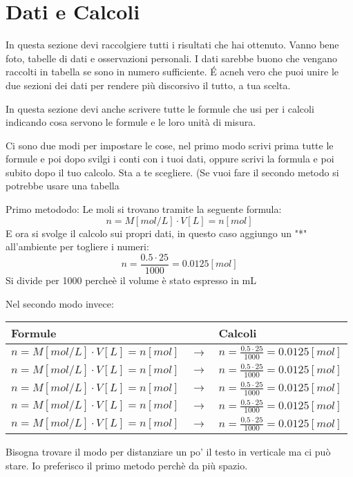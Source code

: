 \section{Dati e Calcoli}
In questa sezione devi raccolgiere tutti i risultati che hai ottenuto. Vanno bene  foto, tabelle di dati e osservazioni personali. I dati sarebbe buono che vengano raccolti in tabella se sono in numero sufficiente. \'E acneh vero che puoi unire le due sezioni dei dati per rendere più discorsivo il tutto, a tua scelta.

In questa sezione devi anche scrivere tutte le formule che usi per i calcoli indicando cosa servono le formule e le loro unità di misura.

Ci sono due modi per impostare le cose, nel primo modo scrivi prima tutte le formule e poi dopo svilgi i conti con i tuoi dati, oppure scrivi la formula e poi subito dopo il tuo calcolo. Sta a te scegliere. (Se vuoi fare il secondo metodo si potrebbe usare una tabella

Primo metododo:
Le moli si trovano tramite la seguente formula:
\begin{equation}
   n=M[mol/L]\cdot V[L]=n [mol] 
   \label{eq:mol} %
\end{equation}
E ora si svolge il calcolo sui propri dati, in questo caso aggiungo un "*" all'ambiente per togliere i numeri:
\begin{equation*}
   n=\frac{0.5\cdot 25}{1000}=0.0125 [mol] 
\end{equation*}
Si divide per  1000 percheè il volume è stato espresso in mL

Nel secondo modo invece:
\begin{center}
    \begin{tabularx}{0.9\textwidth}{XcX}
    Formule & & Calcoli\\
    \midrule
    $n=M[mol/L]\cdot V[L]=n [mol] $ &$\rightarrow$& $ n=\frac{0.5\cdot 25}{1000}=0.0125 [mol] $\\
    $n=M[mol/L]\cdot V[L]=n [mol] $ &$\rightarrow$& $ n=\frac{0.5\cdot 25}{1000}=0.0125 [mol] $\\
    $n=M[mol/L]\cdot V[L]=n [mol] $ &$\rightarrow$& $ n=\frac{0.5\cdot 25}{1000}=0.0125 [mol] $\\
    $n=M[mol/L]\cdot V[L]=n [mol] $ &$\rightarrow$& $ n=\frac{0.5\cdot 25}{1000}=0.0125 [mol] $\\
    $n=M[mol/L]\cdot V[L]=n [mol] $ &$\rightarrow$& $ n=\frac{0.5\cdot 25}{1000}=0.0125 [mol] $\\
    \end{tabularx}
\end{center}
Bisogna trovare il modo per distanziare un po' il testo in verticale ma ci può stare.
Io preferisco il primo metodo perchè da più spazio.


